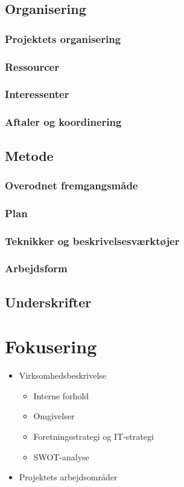 \documentclass[12pt, a4paper]{report}
\begin{document}
\subsection{Organisering}
\subsubsection{Projektets organisering}
\subsubsection{Ressourcer}
\subsubsection{Interessenter}
\subsubsection{Aftaler og koordinering}

\subsection{Metode}
\subsubsection{Overodnet fremgangsmåde}
\subsubsection{Plan}
\subsubsection{Teknikker og beskrivelsesværktøjer}
\subsubsection{Arbejdsform}

\subsection{Underskrifter}

\section*{Fokusering}
 \begin{itemize}
   \item Virksomhedsbeskrivelse

\begin{itemize}

   \item Interne forhold

   \item Omgivelser



   \item Foretningsstrategi og IT-strategi

   \item SWOT-analyse

\end{itemize}
   \item Projektets arbejdsområder
 \end{itemize}
\end{document}
